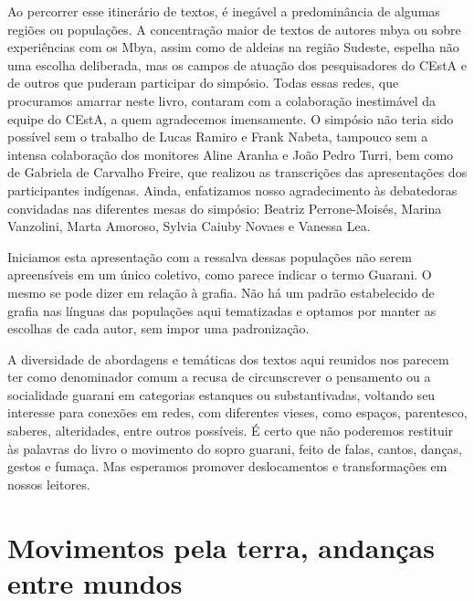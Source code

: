 Ao percorrer esse itinerário de textos, é inegável a predominância de
algumas regiões ou populações. A concentração maior de textos de
autores mbya ou sobre experiências com os Mbya, assim como de aldeias
na região Sudeste, espelha não uma escolha deliberada, mas os campos de
atuação dos pesquisadores do CEstA e de outros que puderam participar
do simpósio. Todas essas redes, que procuramos amarrar neste livro,
contaram com a colaboração inestimável da equipe do CEstA, a quem
agradecemos imensamente. O simpósio não teria sido possível sem o
trabalho de Lucas Ramiro e Frank Nabeta, tampouco sem a intensa
colaboração dos monitores Aline Aranha e João Pedro Turri, bem como de
Gabriela de Carvalho Freire, que realizou as transcrições das
apresentações dos participantes indígenas. Ainda, enfatizamos nosso
agradecimento às debatedoras convidadas nas diferentes mesas do
simpósio: Beatriz Perrone-Moisés, Marina Vanzolini, Marta Amoroso,
Sylvia Caiuby Novaes e Vanessa Lea.

Iniciamos esta apresentação com a ressalva dessas populações não serem
apreensíveis em um único coletivo, como parece indicar o termo Guarani.
O mesmo se pode dizer em relação à grafia. Não há um padrão
estabelecido de grafia nas línguas das populações aqui tematizadas e
optamos por manter as escolhas de cada autor, sem impor uma
padronização. 

A diversidade de abordagens e temáticas dos textos aqui reunidos nos
parecem ter como denominador comum a recusa de circunscrever o
pensamento ou a socialidade guarani em categorias estanques ou
substantivadas, voltando seu interesse para conexões em redes, com
diferentes vieses, como espaços, parentesco, saberes, alteridades,
entre outros possíveis. É certo que não poderemos restituir às palavras
do livro o movimento do sopro guarani, feito de falas, cantos, danças,
gestos e fumaça. Mas esperamos promover deslocamentos e transformações
em nossos leitores. 

\part{Movimentos pela terra, andanças entre mundos}

